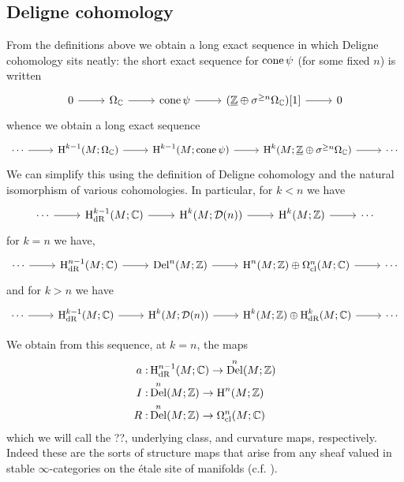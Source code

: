 \documentclass{amsart}
\DeclareMathOperator{\Del}{Del} %
\begin{document}
\subsection{Deligne cohomology}
From the definitions above we obtain a long exact sequence in which Deligne cohomology
sits neatly:
the short exact sequence for $\operatorname{cone}\psi$ (for some fixed $n$) is written
\begin{equation*}
    \begin{tikzcd}
        0\rar& \Omega_\C \rar& \cone\psi \rar& (\underline{\Z}\oplus\sigma^{\geq n}\Omega_\C)[1] \rar& 0
    \end{tikzcd}
\end{equation*}
whence we obtain a long exact sequence
\begin{equation*}
    \begin{tikzcd}
        \cdots\rar&\HH^{k-1}(M;\Omega_\C) \rar& \HH^{k-1}(M;\cone\psi) \rar& \HH^k(M;\underline{\Z}\oplus\sigma^{\geq n}\Omega_\C) \rar& \cdots
    \end{tikzcd}
\end{equation*}
We can simplify this using the definition of Deligne cohomology and the natural isomorphism
of various cohomologies. In particular, for $k<n$ we have
\begin{equation*}
    \begin{tikzcd}
        \cdots\rar&\HH^{k-1}_\text{dR}(M;\C) \rar& \HH^k(M;\mathcal{D}(n)) \rar& \HH^k(M;\Z) \rar& \cdots
    \end{tikzcd}
\end{equation*}
for $k=n$ we have,
\begin{equation*}
    \begin{tikzcd}
        \cdots\rar&\HH^{n-1}_\text{dR}(M;\C) \rar& \Del^n(M;\Z) \rar& \HH^n(M;\Z)\oplus\Omega^n_\text{cl}(M;\C) \rar& \cdots
    \end{tikzcd}
\end{equation*}
and for $k>n$ we have
\begin{equation*}
    \begin{tikzcd}
        \cdots\rar&\HH^{k-1}_\text{dR}(M;\C) \rar& \HH^k(M;\mathcal{D}(n)) \rar& \HH^k(M;\Z)\oplus\HH^k_\text{dR}(M;\C) \rar& \cdots
    \end{tikzcd}
\end{equation*}

We obtain from this sequence, at $k=n$, the maps
\begin{align*}
    a:& \HH^{n-1}_\text{dR}(M;\C) \to \Del^n(M;\Z)\\
    I:& \Del^n(M;\Z) \to \HH^n(M;\Z)\\
    R:& \Del^n(M;\Z) \to \Omega^n_\text{cl}(M;\C)
\end{align*}
which we will call the ??, underlying class, and curvature maps, respectively.
Indeed these are the sorts of structure maps that arise from any sheaf valued in stable
$\infty$-categories on the \'etale site of manifolds (c.f. \cite{bnv}).
\end{document}
